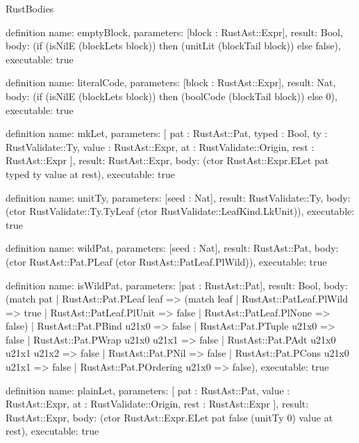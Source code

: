 \begin{lexlean}{RustBodies}
\begin{semanticmodule}
definition{
  name: emptyBlock,
  parameters: [block : RustAst::Expr],
  result: Bool,
  body: (if (isNilE (blockLets block)) then (unitLit (blockTail block)) else false),
  executable: true
}

definition{
  name: literalCode,
  parameters: [block : RustAst::Expr],
  result: Nat,
  body: (if (isNilE (blockLets block)) then (boolCode (blockTail block)) else 0),
  executable: true
}

definition{
  name: mkLet,
  parameters: [
    pat : RustAst::Pat,
    typed : Bool,
    ty : RustValidate::Ty,
    value : RustAst::Expr,
    at : RustValidate::Origin,
    rest : RustAst::Expr
  ],
  result: RustAst::Expr,
  body: (ctor RustAst::Expr.ELet pat typed ty value at rest),
  executable: true
}

definition{
  name: unitTy,
  parameters: [seed : Nat],
  result: RustValidate::Ty,
  body: (ctor RustValidate::Ty.TyLeaf (ctor RustValidate::LeafKind.LkUnit)),
  executable: true
}

definition{
  name: wildPat,
  parameters: [seed : Nat],
  result: RustAst::Pat,
  body: (ctor RustAst::Pat.PLeaf (ctor RustAst::PatLeaf.PlWild)),
  executable: true
}

definition{
  name: isWildPat,
  parameters: [pat : RustAst::Pat],
  result: Bool,
  body: (match pat
    | RustAst::Pat.PLeaf leaf => (match leaf
      | RustAst::PatLeaf.PlWild => true
      | RustAst::PatLeaf.PlUnit => false
      | RustAst::PatLeaf.PlNone => false)
    | RustAst::Pat.PBind u21x0 => false
    | RustAst::Pat.PTuple u21x0 => false
    | RustAst::Pat.PWrap u21x0 u21x1 => false
    | RustAst::Pat.PAdt u21x0 u21x1 u21x2 => false
    | RustAst::Pat.PNil => false
    | RustAst::Pat.PCons u21x0 u21x1 => false
    | RustAst::Pat.POrdering u21x0 => false),
  executable: true
}

definition{
  name: plainLet,
  parameters: [
    pat : RustAst::Pat,
    value : RustAst::Expr,
    at : RustValidate::Origin,
    rest : RustAst::Expr
  ],
  result: RustAst::Expr,
  body: (ctor RustAst::Expr.ELet pat false (unitTy 0) value at rest),
  executable: true
}


\end{semanticmodule}
\end{lexlean}

